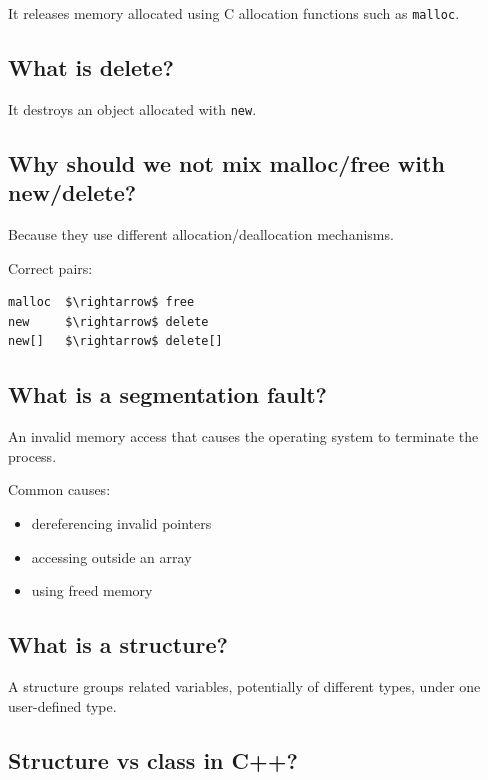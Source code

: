 It releases memory allocated using C allocation functions such as \texttt{malloc}.

\medskip

\subsection{What is delete?}

It destroys an object allocated with \texttt{new}.

\medskip

\subsection{Why should we not mix malloc/free with new/delete?}

Because they use different allocation/deallocation mechanisms.

Correct pairs:

\begin{lstlisting}
malloc  $\rightarrow$ free
new     $\rightarrow$ delete
new[]   $\rightarrow$ delete[]
\end{lstlisting}

\medskip

\subsection{What is a segmentation fault?}

An invalid memory access that causes the operating system to terminate the process.

Common causes:

\begin{itemize}
  \item dereferencing invalid pointers
  \item accessing outside an array
  \item using freed memory
\end{itemize}

\medskip

\subsection{What is a structure?}

A structure groups related variables, potentially of different types, under one user-defined type.

\medskip

\subsection{Structure vs class in C++?}

